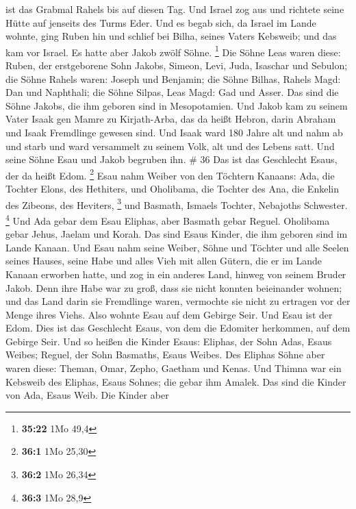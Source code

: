 ist das Grabmal Rahels bis auf diesen Tag.  Und Israel zog
aus und richtete seine Hütte auf jenseits des Turms Eder. 
Und es begab sich, da Israel im Lande wohnte, ging Ruben hin und schlief
bei Bilha, seines Vaters Kebsweib; und das kam vor Israel. Es hatte aber
Jakob zwölf Söhne. \footnote{\textbf{35:22} 1Mo 49,4}  Die
Söhne Leas waren diese: Ruben, der erstgeborene Sohn Jakobs, Simeon,
Levi, Juda, Isaschar und Sebulon;  die Söhne Rahels waren:
Joseph und Benjamin;  die Söhne Bilhas, Rahels Magd: Dan
und Naphthali;  die Söhne Silpas, Leas Magd: Gad und Asser.
Das sind die Söhne Jakobs, die ihm geboren sind in Mesopotamien.
 Und Jakob kam zu seinem Vater Isaak gen Mamre zu
Kirjath-Arba, das da heißt Hebron, darin Abraham und Isaak Fremdlinge
gewesen sind.  Und Isaak ward 180 Jahre alt 
und nahm ab und starb und ward versammelt zu seinem Volk, alt und des
Lebens satt. Und seine Söhne Esau und Jakob begruben ihn. \# 36
 Das ist das Geschlecht Esaus, der da heißt Edom.
\footnote{\textbf{36:1} 1Mo 25,30}  Esau nahm Weiber von den
Töchtern Kanaans: Ada, die Tochter Elons, des Hethiters, und Oholibama,
die Tochter des Ana, die Enkelin des Zibeons, des Heviters, \footnote{\textbf{36:2}
  1Mo 26,34}  und Basmath, Ismaels Tochter, Nebajoths
Schwester. \footnote{\textbf{36:3} 1Mo 28,9}  Und Ada gebar
dem Esau Eliphas, aber Basmath gebar Reguel.  Oholibama
gebar Jehus, Jaelam und Korah. Das sind Esaus Kinder, die ihm geboren
sind im Lande Kanaan.  Und Esau nahm seine Weiber, Söhne und
Töchter und alle Seelen seines Hauses, seine Habe und alles Vieh mit
allen Gütern, die er im Lande Kanaan erworben hatte, und zog in ein
anderes Land, hinweg von seinem Bruder Jakob.  Denn ihre
Habe war zu groß, dass sie nicht konnten beieinander wohnen; und das
Land darin sie Fremdlinge waren, vermochte sie nicht zu ertragen vor der
Menge ihres Viehs.  Also wohnte Esau auf dem Gebirge Seir.
Und Esau ist der Edom.  Dies ist das Geschlecht Esaus, von
dem die Edomiter herkommen, auf dem Gebirge Seir.  Und so
heißen die Kinder Esaus: Eliphas, der Sohn Adas, Esaus Weibes; Reguel,
der Sohn Basmaths, Esaus Weibes.  Des Eliphas Söhne aber
waren diese: Theman, Omar, Zepho, Gaetham und Kenas.  Und
Thimna war ein Kebsweib des Eliphas, Esaus Sohnes; die gebar ihm Amalek.
Das sind die Kinder von Ada, Esaus Weib.  Die Kinder aber
